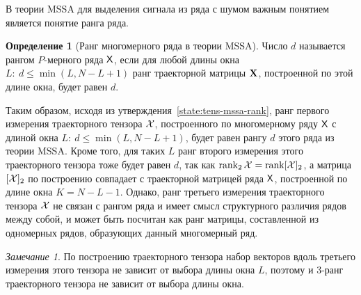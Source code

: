 \documentclass[specialist,
    substylefile = spbu_report.rtx,
    subf,href,colorlinks=true, 12pt]{disser}
\theoremstyle{plain}
\theoremstyle{definition}
\newtheorem{definition}{Определение}[section]
\theoremstyle{remark}
\newtheorem*{remark}{Замечание}
\begin{document}
    В теории MSSA для выделения сигнала из ряда с шумом важным понятием является понятие ранга ряда.
    \begin{definition}[Ранг многомерного ряда в теории MSSA]
        Число $d$ называется рангом $P$-мерного ряда $\mathsf{X}$, если для любой длины окна
        $L:\: d \leqslant\min(L, N-L+1)$ ранг траекторной матрицы $\mathbf{X}$, построенной по этой длине окна,
        будет равен $d$.
    \end{definition}

    Таким образом, исходя из утверждения~\ref{state:tens-mssa-rank}, ранг первого измерения траекторного тензора
    $\mathcal{X}$, построенного по многомерному ряду $\mathsf{X}$ с длиной окна $L:\: {d \leqslant\min(L, N-L+1)}$,
    будет равен рангу $d$ этого ряда из теории MSSA.
    Кроме того, для таких $L$ ранг второго измерения этого траекторного тензора
    тоже будет равен $d$, так как $\operatorname{rank}_2 \mathcal{X} = \operatorname{rank}[\mathcal{X}]_2$,
    а матрица $[\mathcal{X}]_2$ по построению совпадает с траекторной матрицей ряда $\mathsf{X}$, построенной по длине
    окна $K = N - L - 1$.
    Однако, ранг третьего измерения траекторного тензора $\mathcal{X}$ не связан с рангом ряда и имеет смысл
    структурного различия рядов между собой, и может быть посчитан как ранг матрицы, составленной
    из одномерных рядов, образующих данный многомерный ряд.

%

    \begin{remark}
        По построению траекторного тензора набор векторов вдоль третьего измерения этого тензора
        не зависит от выбора длины окна $L$, поэтому и $3$-ранг траекторного тензора не зависит от выбора
        длины окна.
    \end{remark}
\end{document}
